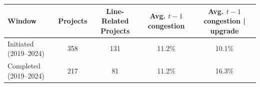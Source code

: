 \begin{table}[!htbp]
\centering
\small
\setlength{\tabcolsep}{6pt}
\renewcommand{\arraystretch}{1.00}
\begin{tabular}{@{}lcccc@{}}
\toprule
Window & Projects & Line-Related Projects & Avg. $t-1$ congestion & Avg. $t-1$ congestion | upgrade \\
\midrule
Initiated (2019--2024) & 358 & 131 & 11.2\% & 10.1\% \\
Completed (2019--2024) & 217 & 81 & 11.2\% & 16.3\% \\
\bottomrule
\end{tabular}
\end{table}
